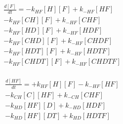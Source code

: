 \begin{equation}
\begin{split}
\frac{d[F]}{dt} =     - k_{HF}[H][F]    + k_{-HF}[HF]     \\%
                      - k_{HF}[CH][F]   + k_{-HF}[CHF]    \\%
                      - k_{HF}[HD][F]    + k_{-HF}[HDF]     \\%
                      - k_{HF}[CHD][F]   + k_{-HF}[CHDF]    \\%
                      - k_{HF}[HDT][F]    + k_{-HF}[HDTF]     \\%
                      - k_{HF}[CHDT][F]   + k_{-HF}[CHDTF]    \\%
\end{split}
\end{equation}

\begin{equation}
\begin{split}
\frac{d[HF]}{dt} =    + k_{HF}[H][F]    - k_{-HF}[HF]     \\%
                      - k_{CH}[C][HF]   + k_{-CH}[CHF]    \\%
                      - k_{HD}[HF][D]   + k_{-HD}[HDF]    \\%
                      - k_{HD}[HF][DT]   + k_{HD}[HDTF]    \\%
\end{split}
\end{equation}

